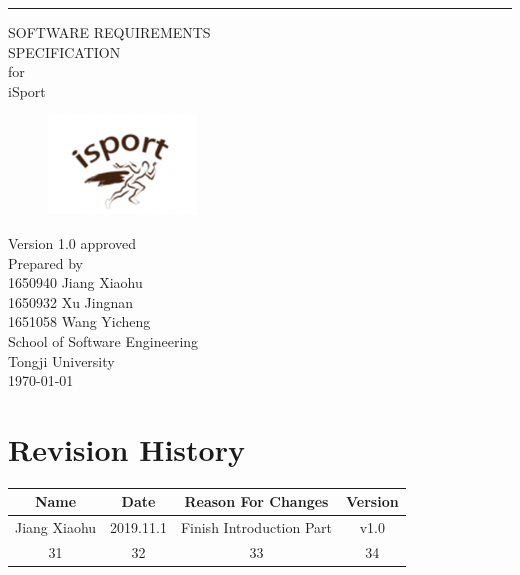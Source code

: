 \documentclass[16pt]{scrreprt}
\date{}
\def\myversion{1.0 }
\begin{document}
\begin{flushright}
    \rule{16cm}{5pt}\vskip1cm
    \begin{bfseries}
        \LARGE{SOFTWARE REQUIREMENTS\\ SPECIFICATION}\\
        \vspace{0.8cm}
        for\\
        \vspace{0.8cm}
        iSport\\
        \begin{figure}[h]
		\flushright
  		\includegraphics[width=.2\textwidth]{logo.png}
		\end{figure}
        \vspace{0.8cm}
        \normalsize{Version \myversion approved}\\
        \vspace{1.0cm}
        Prepared by\vspace{0.5cm} \\ 
        \normalsize{1650940 Jiang Xiaohu\\1650932 Xu Jingnan\\1651058 Wang Yicheng}
        \\
        \vspace{1.1cm}
        \normalsize{School of Software Engineering\\ Tongji University}\\
        \vspace{1.0cm}
        \today\\
    \end{bfseries}
\end{flushright}

\tableofcontents


\chapter*{Revision History}

\begin{center}
    \begin{tabular}{|c|c|c|c|}
        \hline
	    Name & Date & Reason For Changes & Version\\
        \hline
	    Jiang Xiaohu & 2019.11.1 & Finish Introduction Part  & v1.0\\
        \hline
	    31 & 32 & 33 & 34\\
        \hline
    \end{tabular}
\end{center}
\end{document}
